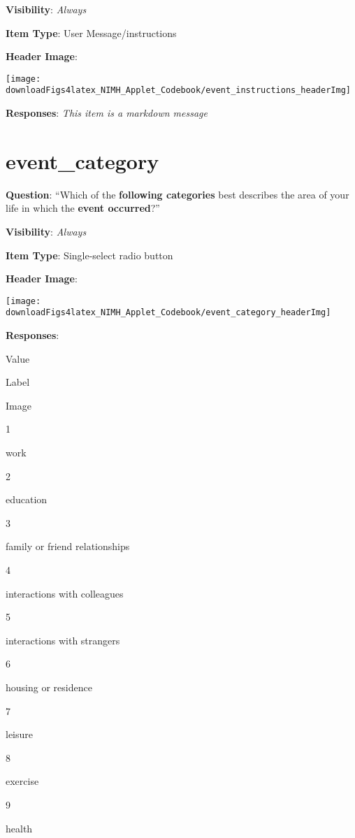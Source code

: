 \documentclass[]{book}
\begin{document}
\textbf{Visibility}: \emph{Always}

\textbf{Item Type}: User Message/instructions

\textbf{Header Image}:

\begin{flushleft}\texttt{[image: downloadFigs4latex\_NIMH\_Applet\_Codebook/event\_instructions\_headerImg]} \end{flushleft}

\textbf{Responses}: \emph{This item is a markdown message}

\hypertarget{event_category}{%
\section{event\_category}\label{event_category}}

\textbf{Question}: ``Which of the \textbf{following categories} best describes the area of your life in which the \textbf{event occurred}?''

\textbf{Visibility}: \emph{Always}

\textbf{Item Type}: Single-select radio button

\textbf{Header Image}:

\begin{flushleft}\texttt{[image: downloadFigs4latex\_NIMH\_Applet\_Codebook/event\_category\_headerImg]} \end{flushleft}

\textbf{Responses}:

Value

Label

Image

1

work

2

education

3

family or friend relationships

4

interactions with colleagues

5

interactions with strangers

6

housing or residence

7

leisure

8

exercise

9

health
\end{document}

